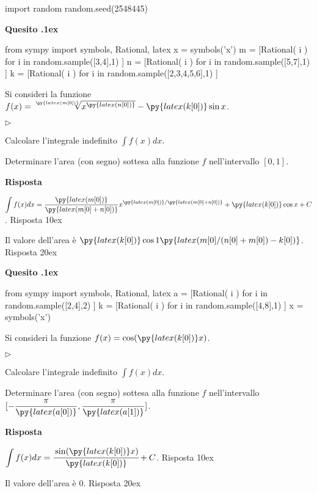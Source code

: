 \documentclass[11pt,twoside,a4paper]{article}
\newcommand{\mylabel}[1]{#1\hfill}
\renewenvironment{itemize}
  {\begin{list}{$\triangleright$}{%
   \setlength{\parskip}{0mm}
   \setlength{\topsep}{.4\baselineskip}
   \setlength{\rightmargin}{0mm}
   \setlength{\listparindent}{0mm}
   \setlength{\itemindent}{0mm}
   \setlength{\labelwidth}{2ex}
   \setlength{\itemsep}{.4\baselineskip}
   \setlength{\parsep}{0mm}
   \setlength{\partopsep}{0mm}
   \setlength{\labelsep}{1ex}
   \setlength{\leftmargin}{\labelwidth+\labelsep}
   \let\makelabel\mylabel}}{%
   \end{list}\vspace*{-1.3mm}}
\newcounter{quesito}
\newenvironment{question}{\bigskip\addtocounter{quesito}{1}\bigskip\bigskip\par\textbf{Quesito \thequesito.\kern1ex}}{\vspace{\parskip}}
\newenvironment{answer}{\par\textbf{Risposta\quad}}{\vspace{\parskip}}
\begin{document}
\begin{pycode}
import random
random.seed(2548445)
\end{pycode}
\begin{question}
\begin{pycode}
from sympy import symbols, Rational, latex
x = symbols('x')
m = [Rational( i ) for i in random.sample([3,4],1) ]
n = [Rational( i ) for i in random.sample([5,7],1) ]
k = [Rational( i ) for i in random.sample([2,3,4,5,6],1) ]
\end{pycode}
Si consideri la funzione $f(x) = \sqrt[\py{latex(m[0])}]{x^{\py{latex(n[0])}}} - \py{latex(k[0])}\sin x$.
\begin{itemize}
\item[1.] Calcolare l'integrale indefinito $\displaystyle \int f(x) dx$.
\item[2.] Determinare l'area (con segno) sottesa alla funzione $f$ nell'intervallo $[0,1]$.
\end{itemize}
\begin{answer}

{\color{blue}
$\displaystyle \int f(x) dx = \dfrac{\py{latex(m[0])}}{\py{latex(m[0]+n[0])}}x^{\py{latex(m[0])}/\py{latex(m[0]+n[0])}} + \py{latex(k[0])}\cos x + C$.
\hfill Risposta 1\kern0ex}

\smallskip
{\color{blue} Il valore dell'area è
$\py{latex(k[0])}\cos 1 \py{latex(m[0]/(n[0]+m[0])-k[0])}$.
\hfill Risposta 2\kern0ex}

\end{answer}
\end{question}
\begin{question}
\begin{pycode}
from sympy import symbols, Rational, latex
a = [Rational( i ) for i in random.sample([2,4],2) ]
k = [Rational( i ) for i in random.sample([4,8],1) ]
x = symbols('x')
\end{pycode}
Si consideri la funzione $f(x) = \cos(\py{latex(k[0])}x)$.
\begin{itemize}
\item[1.] Calcolare l'integrale indefinito $\displaystyle \int f(x) dx$.
\item[2.] Determinare l'area (con segno) sottesa alla funzione $f$ nell'intervallo $[-\dfrac{\pi}{\py{latex(a[0])}},\dfrac{\pi}{\py{latex(a[1])}}]$.
\end{itemize}
\begin{answer}

{\color{blue}
$\displaystyle \int f(x) dx = \cfrac{\sin(\py{latex(k[0])}x)}{\py{latex(k[0])}} + C$.
\hfill Risposta 1\kern0ex}

\smallskip
{\color{blue} Il valore dell'area è 0.
\hfill Risposta 2\kern0ex}

\end{answer}
\end{question}
\end{document}
